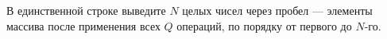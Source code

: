 В единственной строке выведите $N$ целых чисел через пробел --- элементы массива после применения всех $Q$ операций, по порядку от первого до $N$-го.